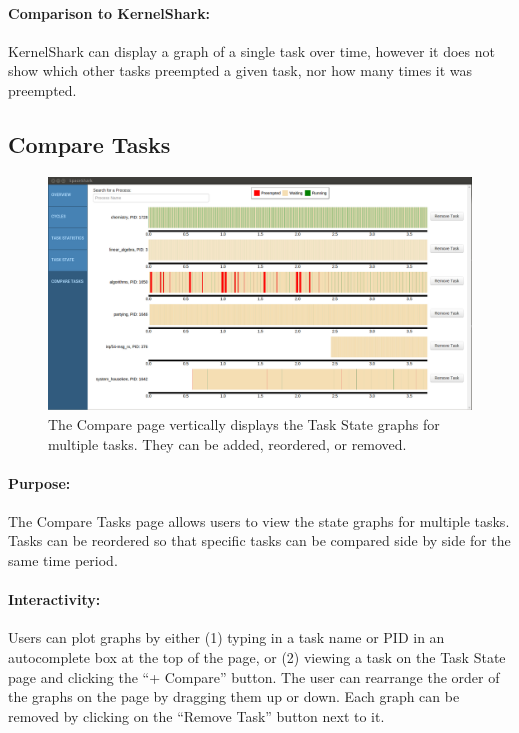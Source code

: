 \documentclass{hmcclinic}
\begin{document}
\paragraph{Comparison to KernelShark:}
     KernelShark can display a graph of a single task over time, however it does not show which other tasks preempted a given task, nor how many times it was preempted.
  
  \subsection{Compare Tasks} %
  
  \begin{figure}[H]
  \includegraphics[scale=0.3]{compare-page.png}
  \caption{The Compare page vertically displays the Task State graphs for
  multiple tasks. They can be added, reordered, or removed.}
  \end{figure}

\paragraph{Purpose:}
The Compare Tasks page allows users to view the state graphs for multiple tasks. Tasks can be reordered so that specific tasks can
be compared side by side for the same time period. 

\paragraph{Interactivity:}
Users can plot graphs by either (1) typing in a task name or PID in an autocomplete box at the top of the page, or
(2) viewing a task on the Task State page and clicking the ``+ Compare''
button. The user can
rearrange the order of the graphs on the page by dragging them up or down. Each
graph can be removed by clicking on the ``Remove Task'' button next to it.
    
\end{document}
